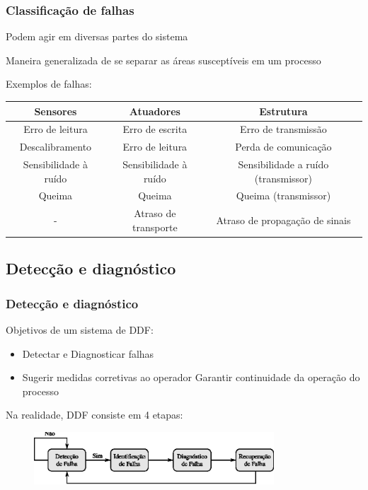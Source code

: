 \documentclass{beamer}
\begin{document}
\begin{frame}
    \frametitle{Classificação de falhas}

    Podem agir em diversas partes do sistema

    \vspace{0.25cm}

    Maneira generalizada de se separar as áreas susceptíveis em um processo

    \vspace{0.25cm}

    Exemplos de falhas:

\begin{table}[htb]
\scriptsize
\centering
\begin{tabular}{|c|c|c|}
\hline
{\bf Sensores} & {\bf Atuadores} & {\bf Estrutura}\\
\hline
\hline
Erro de leitura & Erro de escrita & Erro de transmissão\\
\hline
Descalibramento & Erro de leitura & Perda de comunicação\\
\hline
Sensibilidade à ruído & Sensibilidade à ruído & Sensibilidade a ruído
(transmissor)\\
\hline
Queima & Queima & Queima (transmissor)\\
\hline
- & Atraso de transporte & Atraso de propagação de sinais\\
\hline
\end{tabular}
\end{table}

\end{frame}

\subsection{Detecção e diagnóstico}
\begin{frame}
    \frametitle{Detecção e diagnóstico}

    Objetivos de um sistema de DDF:

\begin{itemize}
    \item Detectar e Diagnosticar falhas
    \item Sugerir medidas corretivas ao operador \implica Garantir continuidade
          da operação do processo
\end{itemize}

    Na realidade, DDF consiste em 4 etapas:

\begin{figure}[htb]
\centering
    \includegraphics[width=0.8\textwidth]
    {imgs/detec_diag/eps/fases_monitoramento}
\end{figure}
\end{frame}
\end{document}
